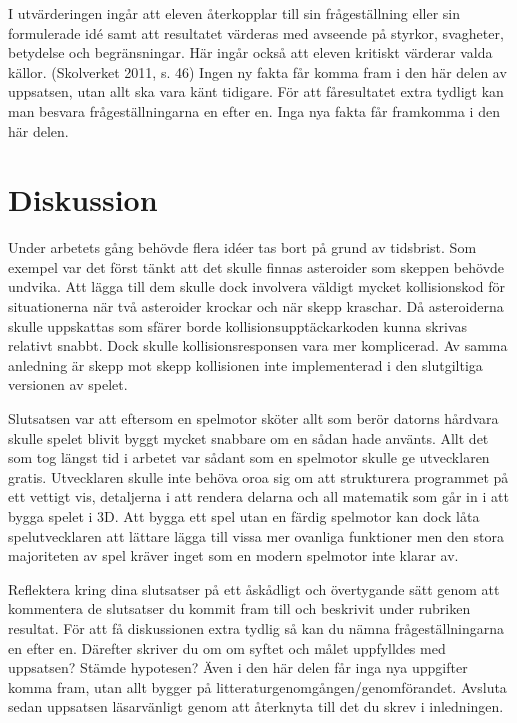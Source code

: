 \documentclass[12pt, a4paper]{article}
\begin{document}
	\begin{small}
		I utvärderingen ingår att eleven återkopplar till sin frågeställning eller sin
formulerade idé samt att resultatet värderas med avseende på styrkor,
svagheter, betydelse och begränsningar. Här ingår också att eleven kritiskt
värderar valda källor. (Skolverket 2011, s. 46) Ingen ny fakta får komma fram i
den här delen av uppsatsen, utan allt ska vara känt tidigare. För att fåresultatet extra tydligt kan man besvara frågeställningarna en efter en. Inga
nya fakta får framkomma i den här delen.
	\end{small}
	
	\newpage
	\section{Diskussion}
	
	Under arbetets gång behövde flera idéer tas bort på grund av tidsbrist. Som exempel var det först tänkt att det skulle finnas asteroider som skeppen behövde undvika. Att lägga till dem skulle dock involvera väldigt mycket kollisionskod för situationerna när två asteroider krockar och när skepp kraschar. Då asteroiderna skulle uppskattas som sfärer borde kollisionsupptäckarkoden kunna skrivas relativt snabbt. Dock skulle kollisionsresponsen vara mer komplicerad. Av samma anledning är skepp mot skepp kollisionen inte implementerad i den slutgiltiga versionen av spelet. 
	
	Slutsatsen var att eftersom en spelmotor sköter allt som berör datorns hårdvara skulle spelet blivit byggt mycket snabbare om en sådan hade använts. Allt det som tog längst tid i arbetet var sådant som en spelmotor skulle ge utvecklaren gratis. Utvecklaren skulle inte behöva oroa sig om att strukturera programmet på ett vettigt vis, detaljerna i att rendera delarna och all matematik som går in i att bygga spelet i 3D. Att bygga ett spel utan en färdig spelmotor kan dock låta spelutvecklaren att lättare lägga till vissa mer ovanliga funktioner men den stora majoriteten av spel kräver inget som en modern spelmotor inte klarar av. 
	
	\begin{small}
		Reflektera kring dina slutsatser på ett åskådligt och övertygande sätt genom
att kommentera de slutsatser du kommit fram till och beskrivit under rubriken
resultat. För att få diskussionen extra tydlig så kan du nämna
frågeställningarna en efter en. Därefter skriver du om om syftet och målet
uppfylldes med uppsatsen? Stämde hypotesen? Även i den här delen får inga
nya uppgifter komma fram, utan allt bygger på
litteraturgenomgången/genomförandet.
Avsluta sedan uppsatsen läsarvänligt genom att återknyta till det du skrev i
inledningen.
	\end{small}
	
\end{document}
